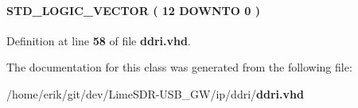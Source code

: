 \paragraph[{sub\+\_\+wire1}]{ {\bfseries \textcolor{comment}{S\+T\+D\+\_\+\+L\+O\+G\+I\+C\+\_\+\+V\+E\+C\+T\+OR}\textcolor{vhdlchar}{ }\textcolor{vhdlchar}{(}\textcolor{vhdlchar}{ }\textcolor{vhdlchar}{ } \textcolor{vhdldigit}{12} \textcolor{vhdlchar}{ }\textcolor{keywordflow}{D\+O\+W\+N\+TO}\textcolor{vhdlchar}{ }\textcolor{vhdlchar}{ } \textcolor{vhdldigit}{0} \textcolor{vhdlchar}{ }\textcolor{vhdlchar}{)}\textcolor{vhdlchar}{ }} \hspace{0.3cm}{\ttfamily [Signal]}}\label{classddri_1_1SYN_a9e89f3847c527c4a2734619d8b28f0d7}


Definition at line {\bf 58} of file {\bf ddri.\+vhd}.



The documentation for this class was generated from the following file\+:\begin{DoxyCompactItemize}
\item 
/home/erik/git/dev/\+Lime\+S\+D\+R-\/\+U\+S\+B\+\_\+\+G\+W/ip/ddri/{\bf ddri.\+vhd}\end{DoxyCompactItemize}

